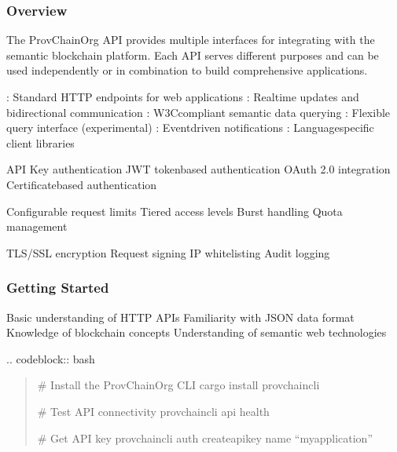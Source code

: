 \documentclass[letterpaper,10pt,english]{sphinxmanual}
\begin{document}
\subsubsection{Overview}
\label{\detokenize{api/index:overview}}
\sphinxAtStartPar
The ProvChainOrg API provides multiple interfaces for integrating with the semantic blockchain platform. Each API serves different purposes and can be used independently or in combination to build comprehensive applications.

\sphinxAtStartPar
{}
\sphinxhyphen{} : Standard HTTP endpoints for web applications
\sphinxhyphen{} : Real\sphinxhyphen{}time updates and bidirectional communication
\sphinxhyphen{} : W3C\sphinxhyphen{}compliant semantic data querying
\sphinxhyphen{} : Flexible query interface (experimental)
\sphinxhyphen{} : Event\sphinxhyphen{}driven notifications
\sphinxhyphen{} : Language\sphinxhyphen{}specific client libraries

\sphinxAtStartPar
{}
\sphinxhyphen{} API Key authentication
\sphinxhyphen{} JWT token\sphinxhyphen{}based authentication
\sphinxhyphen{} OAuth 2.0 integration
\sphinxhyphen{} Certificate\sphinxhyphen{}based authentication

\sphinxAtStartPar
{}
\sphinxhyphen{} Configurable request limits
\sphinxhyphen{} Tiered access levels
\sphinxhyphen{} Burst handling
\sphinxhyphen{} Quota management

\sphinxAtStartPar
{}
\sphinxhyphen{} TLS/SSL encryption
\sphinxhyphen{} Request signing
\sphinxhyphen{} IP whitelisting
\sphinxhyphen{} Audit logging


\subsubsection{Getting Started}
\label{\detokenize{api/index:getting-started}}
\sphinxAtStartPar
{}
\sphinxhyphen{} Basic understanding of HTTP APIs
\sphinxhyphen{} Familiarity with JSON data format
\sphinxhyphen{} Knowledge of blockchain concepts
\sphinxhyphen{} Understanding of semantic web technologies

\sphinxAtStartPar
{}
.. code\sphinxhyphen{}block:: bash
\begin{quote}

\sphinxAtStartPar
\# Install the ProvChainOrg CLI
cargo install provchain\sphinxhyphen{}cli

\sphinxAtStartPar
\# Test API connectivity
provchain\sphinxhyphen{}cli api health

\sphinxAtStartPar
\# Get API key
provchain\sphinxhyphen{}cli auth create\sphinxhyphen{}api\sphinxhyphen{}key \textendash{}name “my\sphinxhyphen{}application”
\end{quote}
\end{document}
